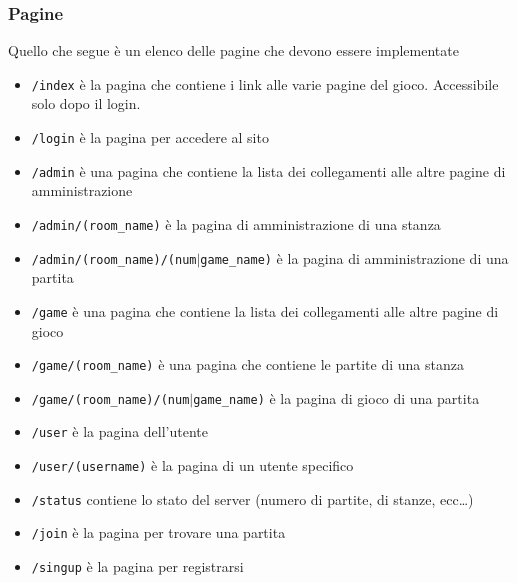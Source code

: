 \documentclass[10pt,a4paper]{article}
\newcommand{\pageurl}[1]{\small\texttt{#1}}
\begin{document}
\subsubsection*{Pagine}
Quello che segue è un elenco delle pagine che devono essere implementate
\begin{itemize}
\item \pageurl{/index} è la pagina che contiene i link alle varie pagine del gioco. Accessibile solo dopo il login.
\item \pageurl{/login} è la pagina per accedere al sito
\item \pageurl{/admin} è una pagina che contiene la lista dei collegamenti alle altre pagine di amministrazione 
\item \pageurl{/admin/(room\_name)} è la pagina di amministrazione di una stanza
\item \pageurl{/admin/(room\_name)/(num$|$game\_name)} è la pagina di amministrazione di una partita
\item \pageurl{/game} è una pagina che contiene la lista dei collegamenti alle altre pagine di gioco
\item \pageurl{/game/(room\_name)} è una pagina che contiene le partite di una stanza
\item \pageurl{/game/(room\_name)/(num$|$game\_name)} è la pagina di gioco di una partita
\item \pageurl{/user} è la pagina dell'utente
\item \pageurl{/user/(username)} è la pagina di un utente specifico
\item \pageurl{/status} contiene lo stato del server (numero di partite, di stanze, ecc\dots)
\item \pageurl{/join} è la pagina per trovare una partita
\item \pageurl{/singup} è la pagina per registrarsi
\end{itemize}

\newpage
\end{document}

